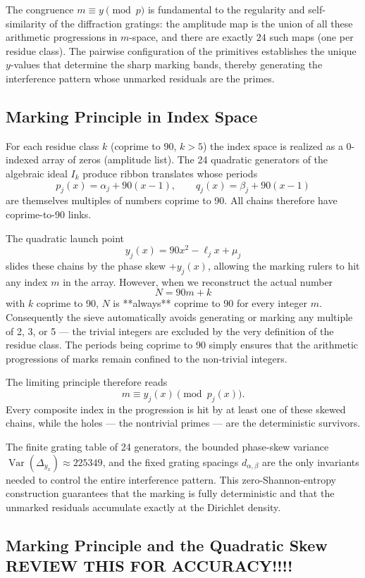 \documentclass[11pt,a4paper]{article}
\begin{document}
The congruence $m\equiv y\pmod{p}$ is fundamental to the regularity and self-similarity of the diffraction gratings: the amplitude map is the union of all these arithmetic progressions in $m$-space, and there are exactly $24$ such maps (one per residue class). The pairwise configuration of the primitives establishes the unique $y$-values that determine the sharp marking bands, thereby generating the interference pattern whose unmarked residuals are the primes.


\subsection{Marking Principle in Index Space}

For each residue class \(k\) (coprime to 90, \(k>5\)) the index space is realized as a 0-indexed array of zeros (amplitude list). The 24 quadratic generators of the algebraic ideal \(I_k\) produce ribbon translates whose periods
\[
p_j(x)=\alpha_j+90(x-1),\qquad q_j(x)=\beta_j+90(x-1)
\]
are themselves multiples of numbers coprime to 90. All chains therefore have coprime-to-90 links.

The quadratic launch point
\[
y_j(x)=90x^2-\ell_j x+\mu_j
\]
slides these chains by the phase skew \(+y_j(x)\), allowing the marking rulers to hit any index \(m\) in the array. However, when we reconstruct the actual number
\[
N=90m+k
\]
with \(k\) coprime to 90, \(N\) is **always** coprime to 90 for every integer \(m\). Consequently the sieve automatically avoids generating or marking any multiple of 2, 3, or 5 — the trivial integers are excluded by the very definition of the residue class. The periods being coprime to 90 simply ensures that the arithmetic progressions of marks remain confined to the non-trivial integers.

The limiting principle therefore reads
\[
m\equiv y_j(x)\pmod{p_j(x)}.
\]
Every composite index in the progression is hit by at least one of these skewed chains, while the holes — the nontrivial primes — are the deterministic survivors.

The finite grating table of 24 generators, the bounded phase-skew variance \(\operatorname{Var}(\Delta_{y_x})\approx225349\), and the fixed grating spacings \(d_{\alpha,\beta}\) are the only invariants needed to control the entire interference pattern. This zero-Shannon-entropy construction guarantees that the marking is fully deterministic and that the unmarked residuals accumulate exactly at the Dirichlet density.


\subsection{Marking Principle and the Quadratic Skew REVIEW THIS FOR ACCURACY!!!!}
\end{document}
